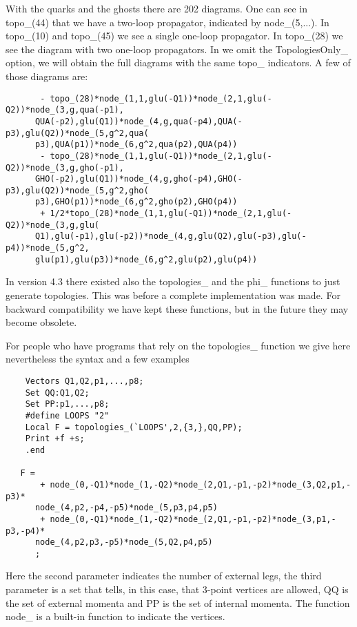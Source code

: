 With the quarks and the ghosts there are 202 diagrams. One can see in 
topo\_(44) that we have a two-loop propagator, indicated by node\_(5,...). 
In topo\_(10) and topo\_(45) we see a single one-loop propagator. In 
topo\_(28) we see the diagram with two one-loop propagators. In we omit the 
TopologiesOnly\_ option, we will obtain the full diagrams with the same 
topo\_ indicators. A few of those diagrams are:
\begin{verbatim}
       - topo_(28)*node_(1,1,glu(-Q1))*node_(2,1,glu(-Q2))*node_(3,g,qua(-p1),
      QUA(-p2),glu(Q1))*node_(4,g,qua(-p4),QUA(-p3),glu(Q2))*node_(5,g^2,qua(
      p3),QUA(p1))*node_(6,g^2,qua(p2),QUA(p4))
       - topo_(28)*node_(1,1,glu(-Q1))*node_(2,1,glu(-Q2))*node_(3,g,gho(-p1),
      GHO(-p2),glu(Q1))*node_(4,g,gho(-p4),GHO(-p3),glu(Q2))*node_(5,g^2,gho(
      p3),GHO(p1))*node_(6,g^2,gho(p2),GHO(p4))
       + 1/2*topo_(28)*node_(1,1,glu(-Q1))*node_(2,1,glu(-Q2))*node_(3,g,glu(
      Q1),glu(-p1),glu(-p2))*node_(4,g,glu(Q2),glu(-p3),glu(-p4))*node_(5,g^2,
      glu(p1),glu(p3))*node_(6,g^2,glu(p2),glu(p4))
\end{verbatim}
 
In version 4.3 there existed also the topologies\_ and the phi\_ 
functions to just generate topologies. This was before a complete 
implementation was made. For backward compatibility we have kept these 
functions, but in the future they may become obsolete.

For people who have programs that rely on the topologies\_ function we give 
here nevertheless the syntax and a few examples
\begin{verbatim}
    Vectors Q1,Q2,p1,...,p8;
    Set QQ:Q1,Q2;
    Set PP:p1,...,p8;
    #define LOOPS "2"
    Local F = topologies_(`LOOPS',2,{3,},QQ,PP);
    Print +f +s;
    .end

   F =
       + node_(0,-Q1)*node_(1,-Q2)*node_(2,Q1,-p1,-p2)*node_(3,Q2,p1,-p3)*
      node_(4,p2,-p4,-p5)*node_(5,p3,p4,p5)
       + node_(0,-Q1)*node_(1,-Q2)*node_(2,Q1,-p1,-p2)*node_(3,p1,-p3,-p4)*
      node_(4,p2,p3,-p5)*node_(5,Q2,p4,p5)
      ;
\end{verbatim}
Here the second parameter indicates the number of external legs, the third 
parameter is a set that tells, in this case, that 3-point vertices are 
allowed, QQ is the set of external momenta and PP is the set of internal 
momenta. The function node\_ is a built-in function to indicate the 
vertices.

